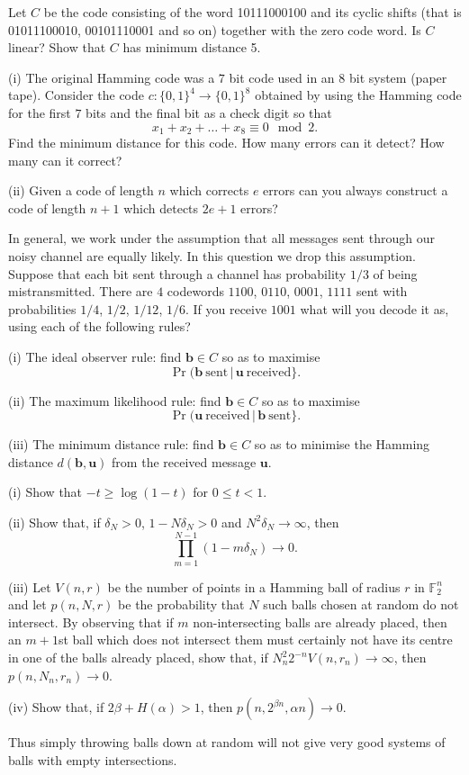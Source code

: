 \begin{question}\label{C2.10}
Let $C$ be the code consisting of the
word 10111000100 and its cyclic shifts (that is
01011100010, 00101110001 and so on) together with
the zero code word. Is $C$ linear? Show that $C$
has minimum distance 5.
\end{question}
\begin{question}\label{C2.11} 
(i) The original Hamming code
was a $7$ bit code used in an $8$ bit system
(paper tape). Consider the code $c:\{0,1\}^{4}\rightarrow\{0,1\}^{8}$
obtained by using the Hamming code for the first $7$ bits
and the final bit as a check digit so that
\[x_{1}+x_{2}+\dots+x_{8}\equiv 0\mod{2}.\]
Find the minimum distance for this code. How many errors
can it detect? How many can it correct?

(ii) Given a code of length $n$ which corrects $e$ errors
can you always construct a code of length $n+1$
which detects $2e+1$ errors?
\end{question}
\begin{question}\label{C2.12} In general,
we work under the assumption
that all messages sent through our noisy channel
are equally likely. In this question
we drop this assumption. Suppose that
each bit sent through a channel has probability
$1/3$ of being mistransmitted. There are $4$
codewords $1100$, $0110$, $0001$, $1111$
sent with probabilities $1/4$, $1/2$, $1/12$, $1/6$.
If you receive $1001$ what will you decode it as, using
each of the following rules?

(i) The ideal observer rule: find ${\mathbf b}\in C$
so as to maximise 
\[\Pr({\mathbf b}\ \text{sent}\,|\,
{\mathbf u}\ \text{received}\}.\]

(ii) The maximum likelihood rule: find ${\mathbf b}\in C$
so as to maximise 
\[\Pr({\mathbf u}\ \text{received}\,|\,
{\mathbf b}\ \text{sent}\}.\] 

(iii) The minimum distance rule: find ${\mathbf b}\in C$
so as to minimise the Hamming distance 
$d({\mathbf b},{\mathbf u})$ from the 
received message ${\mathbf u}$.
\end{question}
\begin{question}\label{E;random ball}\label{C2.13}

(i) Show that $-t\geq \log(1-t)$ for $0\leq t<1$.

(ii) Show that, if $\delta_{N}>0$, $1-N\delta_{N}>0$ and
$N^{2}\delta_{N}\rightarrow\infty$, then
\[\prod_{m=1}^{N-1}(1-m\delta_{N})\rightarrow 0.\]

(iii) Let $V(n,r)$ be the number of points in a Hamming
ball of radius $r$ in ${\mathbb F}_{2}^{n}$ and
let $p(n,N,r)$ be the probability that $N$ such 
balls chosen at random do not intersect.
By observing that if $m$ non-intersecting
balls are already placed, then an $m+1$st ball
which does not intersect them
must certainly not have its centre
in one of the balls already placed,
show that, if $N_{n}^{2}2^{-n}V(n,r_{n})\rightarrow\infty$,
then  $p(n,N_{n},r_{n})\rightarrow 0$.

(iv) Show that,
if $2\beta+H(\alpha)>1$, 
then $p(n,2^{\beta n},\alpha n)\rightarrow 0$.

Thus simply throwing balls down at random will not
give very good systems of balls with empty intersections.
\end{question}  
